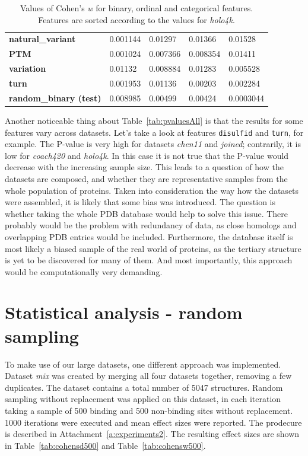 \begin{table}[]
\begin{tabular}{@{}lllll@{}}
\textbf{natural\_variant}     & 0.001144        & 0.01297           & 0.01366         & 0.01528         \\
\textbf{PTM}                  & 0.001024        & 0.007366          & 0.008354        & 0.01411         \\
\textbf{variation}            & 0.01132         & 0.008884          & 0.01283         & 0.005528        \\
\textbf{turn}                 & 0.001953        & 0.01136           & 0.00203         & 0.002284        \\
\textbf{random\_binary (test)}       & 0.008985        & 0.00499           & 0.00424         & 0.0003044       \\ \bottomrule
\end{tabular}
\caption[Values of Cohen's \textit{w}]{Values of Cohen's \textit{w} for binary, ordinal and categorical features. Features are sorted according to the values for \textit{holo4k}.}
\label{tab:cohensw}
\end{table}

Another noticeable thing about Table~\ref{tab:pvaluesAll} is that the results for some features vary across datasets. Let's take a look at features \texttt{disulfid} and \texttt{turn}, for example. The P-value is very high for datasets \textit{chen11} and \textit{joined}; contrarily, it is low for \textit{coach420} and \textit{holo4k}. In this case it is not true that the P-value would decrease with the increasing sample size. This leads to a question of how the datasets are composed, and whether they are representative samples from the whole population of proteins. Taken into consideration the way how the datasets were assembled, it is likely that some bias was introduced. The question is whether taking the whole PDB database would help to solve this issue. There probably would be the problem with redundancy of data, as close homologs and overlapping PDB entries would be included. Furthermore, the database itself is most likely a biased sample of the real world of proteins, as the tertiary structure is yet to be discovered for many of them. And most importantly, this approach would be computationally very demanding.


\section{Statistical analysis - random sampling}

To make use of our large datasets, one different approach was implemented. Dataset \textit{mix} was created by merging all four datasets together, removing a few duplicates. The dataset contains a total number of 5047 structures. Random sampling without replacement was applied on this dataset, in each iteration taking a sample of 500 binding and 500 non-binding sites without replacement. 1000 iterations were executed and mean effect sizes were reported. The prodecure is described in Attachment~\ref{a:experiments2}. The resulting effect sizes are shown in Table~\ref{tab:cohensd500} and Table~\ref{tab:cohensw500}.

